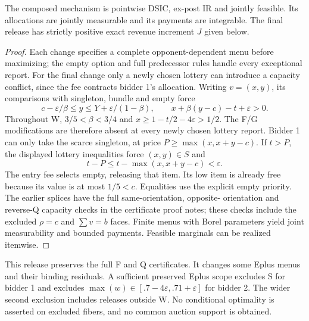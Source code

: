 \begin{proposition}\label{prop:joint-release}
The composed mechanism is pointwise DSIC, ex-post IR and jointly feasible.
Its allocations are jointly measurable and its payments are integrable. The final release has strictly positive
exact revenue increment $J$ given below.
\end{proposition}
\begin{proof}
Each change specifies a complete opponent-dependent menu before maximizing;
the empty option and full predecessor rules handle every exceptional report.
For the final change only a newly chosen lottery can introduce a capacity
conflict, since the fee contracts bidder 1's allocation. Writing $v=(x,y)$,
its comparisons with singleton, bundle and empty force
\[
c-\varepsilon/\beta\le y\le Y+\varepsilon/(1-\beta),\qquad
x+\beta(y-c)-t+\varepsilon>0.
\]
Throughout W, $3/5<\beta<3/4$ and
$x\ge1-t/2-4\varepsilon>1/2$. The F/G modifications are therefore absent
at every newly chosen lottery report. Bidder 1 can only take the scarce
singleton, at price $P\ge\max(x,x+y-c)$. If $t>P$, the displayed lottery
inequalities force $(x,y)\in S$ and
\[
t-P\le t-\max(x,x+y-c)<\varepsilon.
\]
The entry fee selects empty, releasing that item. Its low item is already
free because its value is at most $1/5<c$. Equalities use the explicit empty
priority. The earlier splices have the full same-orientation, opposite-
orientation and reverse-Q capacity checks in the certificate proof notes;
these checks include the excluded $\rho=c$ and $\sum v=b$ faces.
Finite menus with Borel parameters yield joint measurability and bounded
payments. Feasible marginals can be realized itemwise.
\end{proof}

This release preserves the full F and Q certificates. It changes some
Eplus menus and their binding residuals. A sufficient preserved Eplus scope
excludes S for bidder 1 and excludes
$\max(w)\in[.7-4\varepsilon,.71+\varepsilon]$ for bidder 2. The wider
second exclusion includes releases outside W. No conditional optimality is
asserted on excluded fibers, and no common auction support is obtained.

